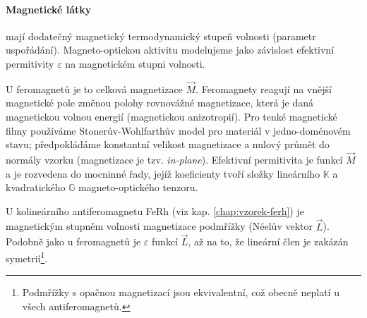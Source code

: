 \paragraph{Magnetické látky} mají dodatečný magnetický termodynamický stupeň volnosti (parametr uspořádání).
Magneto-optickou aktivitu modelujeme jako závislost efektivní permitivity $\varepsilon$ na magnetickém stupni volnosti.

U feromagnetů je to celková magnetizace $\vec{M}$. 
Feromagnety reagují na vnější magnetické pole změnou polohy rovnovážné magnetizace, která je daná magnetickou volnou energií (magnetickou anizotropií).
Pro tenké magnetické filmy používáme Stonerův-Wohlfarthův model\cite{stonerMechanismMagneticHysteresis1991} pro materiál v jedno-doménovém stavu; předpokládáme konstantní velikost magnetizace a nulový průmět do normály vzorku (magnetizace je tzv. \emph{in-plane}).
Efektivní permitivita je funkcí $\vec{M}$ a je rozvedena do mocninné řady, jejíž koeficienty tvoří složky lineárního $\mathbb{K}$ a kvadratického $\mathbb{G}$ magneto-optického tenzoru\cite{visnovskyOpticsMagneticMultilayers2018}.

U kolineárního antiferomagnetu FeRh (viz kap. \ref{chap:vzorek-ferh}) je magnetickým stupněm volnosti magnetizace podmřížky (Néelův vektor $\vec{L}$)\cite{saidlUltrarychlaLaserovaSpektroskopie2018}.
Podobně jako u feromagnetů je $\varepsilon$ funkcí $\vec{L}$, až na to, že lineární člen je zakázán symetrií\footnote{Podmřížky s opačnou magnetizací jsou ekvivalentní, což obecně neplatí u všech antiferomagnetů.}.
